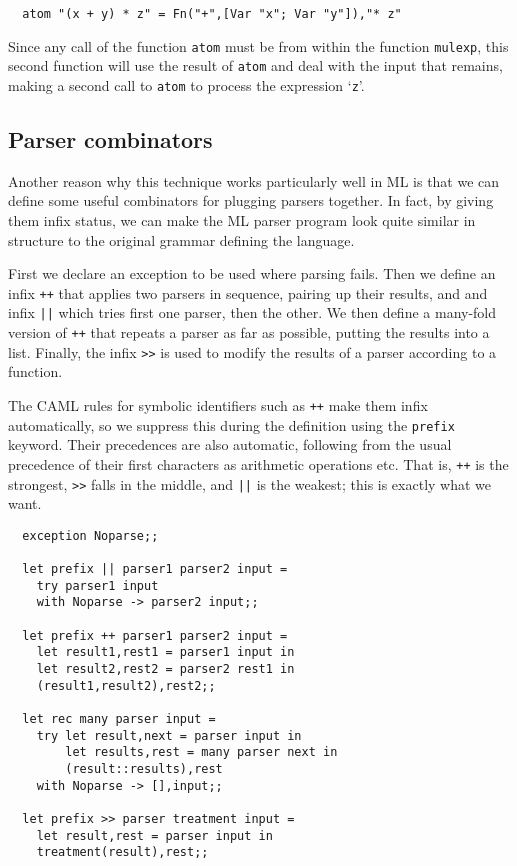 \begin{boxed}\begin{lstlisting}
  atom "(x + y) * z" = Fn("+",[Var "x"; Var "y"]),"* z"
\end{lstlisting}\end{boxed}

Since any call of the function {\verb+atom+} must be from within the function
{\verb!mulexp!}, this second function will use the result of {\verb!atom!} and
deal with the input that remains, making a second call to {\verb!atom!} to
process the expression `{\verb!z!}'.

\subsection{Parser combinators}

Another reason why this technique works particularly well in ML is that we can
define some useful combinators for plugging parsers together. In fact, by
giving them infix status, we can make the ML parser program look quite similar
in structure to the original grammar defining the language.

First we declare an exception to be used where parsing fails. Then we define an
infix {\verb!++!} that applies two parsers in sequence, pairing up their
results, and and infix {\verb!||!} which tries first one parser, then the
other. We then define a many-fold version of {\verb!++!} that repeats a parser
as far as possible, putting the results into a list. Finally, the infix
{\verb!>>!} is used to modify the results of a parser according to a function.

The CAML rules for symbolic identifiers such as {\verb!++!} make them infix
automatically, so we suppress this during the definition using the {\tt prefix}
keyword. Their precedences are also automatic, following from the usual
precedence of their first characters as arithmetic operations etc. That is,
{\verb!++!} is the strongest, {\verb!>>!} falls in the middle, and {\verb!||!}
is the weakest; this is exactly what we want.

\begin{boxed}\begin{lstlisting}
  exception Noparse;;

  let prefix || parser1 parser2 input =
    try parser1 input
    with Noparse -> parser2 input;;

  let prefix ++ parser1 parser2 input =
    let result1,rest1 = parser1 input in
    let result2,rest2 = parser2 rest1 in
    (result1,result2),rest2;;

  let rec many parser input =
    try let result,next = parser input in
        let results,rest = many parser next in
        (result::results),rest
    with Noparse -> [],input;;

  let prefix >> parser treatment input =
    let result,rest = parser input in
    treatment(result),rest;;
\end{lstlisting}\end{boxed}

